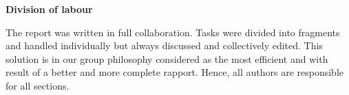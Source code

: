 \vspace{1cm}
\begin{center}
\textbf{Division of labour}
\end{center}
\noindent
The report was written in full collaboration. Tasks were divided into
fragments and handled individually but always discussed and collectively
edited. This solution is in our group philosophy considered as the most
efficient and with result of a better and more complete rapport. Hence, all authors are responsible for all sections.

